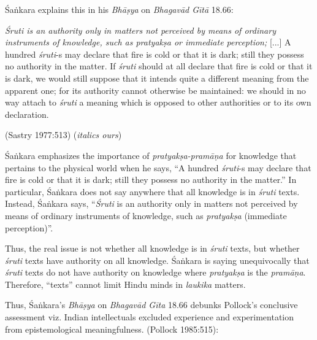 Śaṅkara explains this in his {\sl Bhāṣya} on {\sl Bhagavād Gītā} 18.66:
\begin{myquote}
{\textsl{Śruti is an authority only in matters not perceived by means of ordinary instruments of knowledge, such as pratyakṣa or immediate perception;}} [...] A hundred {\sl śruti}-s may declare that fire is cold or that it is dark; still they possess no authority in the matter. If {\sl śruti} should at all declare that fire is cold or that it is dark, we would still suppose that it intends quite a different meaning from the apparent one; for its authority cannot otherwise be maintained: we should in no way attach to {\sl śruti} a meaning which is opposed to other authorities or to its own declaration.

\hfill (Sastry 1977:513) ({\sl italics ours})
\end{myquote}

Śaṅkara emphasizes the importance of {\sl pratyakṣa-pramāṇa} for knowledge that pertains to the physical world when he says, ``A hundred {\sl śruti}-s may declare that fire is cold or that it is dark; still they possess no authority in the matter.''  In particular, Śaṅkara does not say anywhere that all knowledge is in {\sl śruti} texts. Instead, Śaṅkara says, ``{\sl Śruti} is an authority only in matters not perceived by means of ordinary instruments of knowledge, such as {\sl pratyakṣa} (immediate perception)''. 

Thus, the real issue is not whether all knowledge is in {\sl śruti} texts, but whether {\sl śruti} texts have authority on all knowledge.  Śaṅkara is saying unequivocally that {\sl śruti} texts do not have authority on knowledge where {\sl pratyakṣa} is the {\sl pramāṇa}. Therefore, ``texts'' cannot limit Hindu minds in {\sl laukika} matters.

Thus, Śaṅkara's {\sl Bhāṣya} on {\sl Bhagavād Gīta} 18.66 debunks Pollock's conclusive assessment viz. Indian intellectuals excluded experience and experimentation from epistemological meaningfulness. (Pollock 1985:515):

